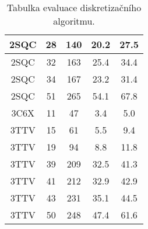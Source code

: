 \begin{table}
\begin{tabular}{||c | c c c c||}
        2SQC & 28 & 140 & 20.2 & 27.5 \\
        \hline
        2SQC & 32 & 163 & 25.4 & 34.4 \\
        \hline
        2SQC & 34 & 167 & 23.2 & 31.4 \\
        \hline
        2SQC & 51 & 265 & 54.1 & 67.8 \\
        \hline
        3C6X & 11 & 47 & 3.4 & 5.0 \\
        \hline
        3TTV & 15 & 61 & 5.5 & 9.4 \\
        \hline
        3TTV & 19 & 94 & 8.8 & 11.8 \\
        \hline
        3TTV & 39 & 209 & 32.5 & 41.3 \\
        \hline
        3TTV & 41 & 212 & 32.9 & 42.9 \\
        \hline
        3TTV & 43 & 231 & 35.1 & 44.5 \\
        \hline
        3TTV & 50 & 248 & 47.4 & 61.6 \\
        \hline
    \end{tabular}
    \caption{Tabulka evaluace diskretizačního algoritmu.}
\end{table}
